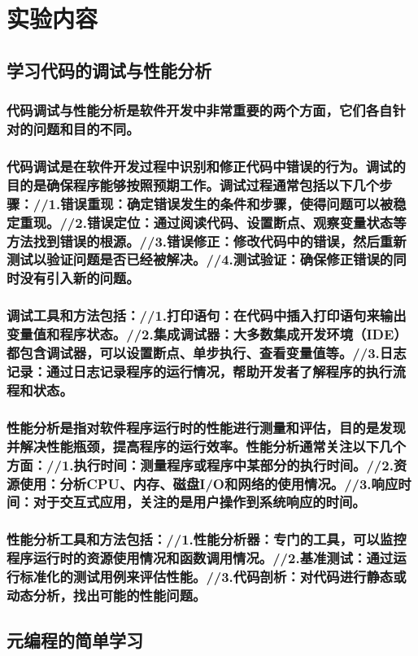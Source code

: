 \documentclass[UTF8,a4paper]{ctexart}
\begin{document}
\begin{sloppypar}
	\section{实验内容}
	\subsection{学习代码的调试与性能分析}
	\subsubsection{代码调试与性能分析是软件开发中非常重要的两个方面，它们各自针对的问题和目的不同。}
	\subsubsection{代码调试是在软件开发过程中识别和修正代码中错误的行为。调试的目的是确保程序能够按照预期工作。调试过程通常包括以下几个步骤：//1.错误重现：确定错误发生的条件和步骤，使得问题可以被稳定重现。//2.错误定位：通过阅读代码、设置断点、观察变量状态等方法找到错误的根源。//3.错误修正：修改代码中的错误，然后重新测试以验证问题是否已经被解决。//4.测试验证：确保修正错误的同时没有引入新的问题。}
	\subsubsection{调试工具和方法包括：//1.打印语句：在代码中插入打印语句来输出变量值和程序状态。//2.集成调试器：大多数集成开发环境（IDE）都包含调试器，可以设置断点、单步执行、查看变量值等。//3.日志记录：通过日志记录程序的运行情况，帮助开发者了解程序的执行流程和状态。}
	\subsubsection{性能分析是指对软件程序运行时的性能进行测量和评估，目的是发现并解决性能瓶颈，提高程序的运行效率。性能分析通常关注以下几个方面：//1.执行时间：测量程序或程序中某部分的执行时间。//2.资源使用：分析CPU、内存、磁盘I/O和网络的使用情况。//3.响应时间：对于交互式应用，关注的是用户操作到系统响应的时间。}
	
	\subsubsection{性能分析工具和方法包括：//1.性能分析器：专门的工具，可以监控程序运行时的资源使用情况和函数调用情况。//2.基准测试：通过运行标准化的测试用例来评估性能。//3.代码剖析：对代码进行静态或动态分析，找出可能的性能问题。}
	\subsection{元编程的简单学习}

\end{sloppypar}
\end{document}
